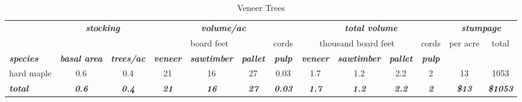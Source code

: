 \documentclass[landscape]{article}
\begin{document}
\begin{table}[H]

\caption{\label{tab:unnamed-chunk-53}Veneer Trees}
\fontsize{10}{12}\selectfont
\begin{tabular}[t]{lcccccccccccc}
\toprule
\multicolumn{1}{c}{\em{\textbf{ }}} & \multicolumn{2}{c}{\em{\textbf{stocking}}} & \multicolumn{4}{c}{\em{\textbf{volume/ac }}} & \multicolumn{4}{c}{\em{\textbf{total volume}}} & \multicolumn{2}{c}{\em{\textbf{stumpage}}} \\
\cmidrule(l{3pt}r{3pt}){2-3} \cmidrule(l{3pt}r{3pt}){4-7} \cmidrule(l{3pt}r{3pt}){8-11} \cmidrule(l{3pt}r{3pt}){12-13}
\multicolumn{3}{c}{ } & \multicolumn{3}{c}{board feet} & \multicolumn{1}{c}{cords} & \multicolumn{3}{c}{thousand board feet} & \multicolumn{1}{c}{cords} & \multicolumn{1}{c}{per acre} & \multicolumn{1}{c}{total} \\
\cmidrule(l{3pt}r{3pt}){4-6} \cmidrule(l{3pt}r{3pt}){7-7} \cmidrule(l{3pt}r{3pt}){8-10} \cmidrule(l{3pt}r{3pt}){11-11} \cmidrule(l{3pt}r{3pt}){12-12} \cmidrule(l{3pt}r{3pt}){13-13}
\rowcolor[HTML]{DCDCDC}  \em{\textbf{species}} & \em{\textbf{basal area}} & \em{\textbf{trees/ac}} & \em{\textbf{veneer}} & \em{\textbf{sawtimber}} & \em{\textbf{pallet}} & \em{\textbf{pulp}} & \em{\textbf{veneer}} & \em{\textbf{sawtimber}} & \em{\textbf{pallet}} & \em{\textbf{pulp}} & \em{\textbf{ }} & \em{\textbf{ }}\\
\midrule
\rowcolor{gray!6}  hard maple & 0.6 & 0.4 & 21 & 16 & 27 & 0.03 & 1.7 & 1.2 & 2.2 & 2 & 13 & 1053\\
 
\rowcolor[HTML]{DCDCDC}  \em{\textbf{total}} & \em{\textbf{0.6}} & \em{\textbf{0.4}} & \em{\textbf{21}} & \em{\textbf{16}} & \em{\textbf{27}} & \em{\textbf{0.03}} & \em{\textbf{1.7}} & \em{\textbf{1.2}} & \em{\textbf{2.2}} & \em{\textbf{2}} & \em{\textbf{\$13}} & \em{\textbf{\$1053}}\\
\bottomrule
\end{tabular}
\end{table}
\end{document}
